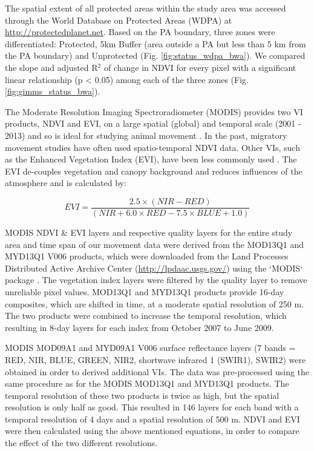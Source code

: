 \documentclass[12pt,a4paper, twoside, english]{article}
\begin{document}
The spatial extent of all protected areas within the study area was accessed through the World Database on Protected Areas (WDPA) at \url{http://protectedplanet.net}. Based on the PA boundary, three zones were differentiated: Protected, 5km Buffer (area outside a PA but less than 5 km from the PA boundary) and Unprotected (Fig. \ref{fig:status_wdpa_bwa}). We compared the slope and adjusted R$^{2}$ of change in NDVI for every pixel with a significant linear relationship (p < 0.05) among each of the three zones (Fig. \ref{fig:gimms_status_bwa}).

The Moderate Resolution Imaging Spectroradiometer (MODIS) provides two VI products, NDVI and EVI, on a large spatial (global) and temporal scale (2001 - 2013) and so is ideal for studying animal movement \citep{Pettorelli2011}. In the past, migratory movement studies have often used spatio-temporal NDVI data. Other VIs, such as the Enhanced Vegetation Index (EVI), have been less commonly used \citep{Neumann2015a}. The EVI de-couples vegetation and canopy background and reduces influences of the atmosphere \citep{Huete2002} and is calculated by:

\begin{equation}
\label{eq:evi}
EVI = \frac{2.5\times(NIR - RED)}{(NIR + 6.0\times RED - 7.5\times BLUE + 1.0)}
\end{equation}

MODIS NDVI \& EVI layers and respective quality layers for the entire study area and time span of our movement data were derived from the MOD13Q1 and MYD13Q1 V006 products, which were downloaded from the Land Processes Distributed Active Archive Center (\url{http://lpdaac.usgs.gov/}) using the `MODIS` package \citep{Mattiuzzi2016}. The vegetation index layers were filtered by the quality layer to remove unreliable pixel values. MOD13Q1 and MYD13Q1 products provide 16-day composites, which are shifted in time, at a moderate spatial resolution of 250 m. The two products were combined to increase the temporal resolution, which resulting in 8-day layers for each index from October 2007 to June 2009. 

MODIS MOD09A1 and MYD09A1 V006 surface reflectance layers (7 bands = RED, NIR, BLUE, GREEN, NIR2, shortwave infrared 1 (SWIR1), SWIR2) were obtained in order to derived additional VIs. The data was pre-processed using the same procedure as for the MODIS MOD13Q1 and MYD13Q1 products. The temporal resolution of these two products is twice as high, but the spatial resolution is only half as good. This resulted in 146 layers for each band with a temporal resolution of 4 days and a spatial resolution of 500 m. NDVI and EVI were then calculated using the above mentioned equations, in order to compare the effect of the two different resolutions.
\end{document}
